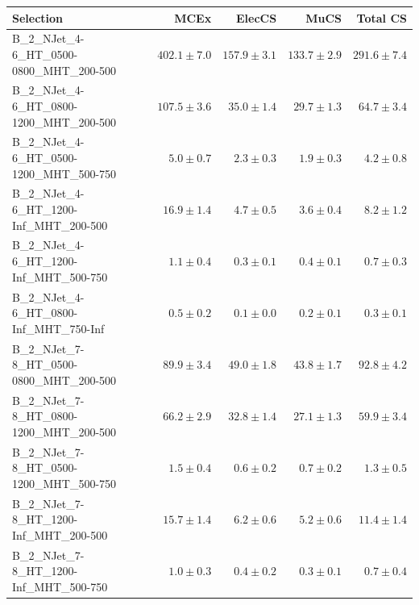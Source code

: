 \documentclass{beamer}
\begin{document}
\begin{frame}
\tiny
\begin{tabular}{lrrrr}
\toprule

                                                Selection  &          MCEx  &         ElecCS  &                     MuCS  &          Total CS  \\ 
\midrule
     B\_2\_NJet\_4-6\_HT\_0500-0800\_MHT\_200-500 &             $402.1\pm7.0$&            $157.9\pm3.1$&            $133.7\pm2.9$&                 $291.6\pm7.4$ \\ 
     B\_2\_NJet\_4-6\_HT\_0800-1200\_MHT\_200-500 &             $107.5\pm3.6$&             $35.0\pm1.4$&             $29.7\pm1.3$&                  $64.7\pm3.4$ \\ 
     B\_2\_NJet\_4-6\_HT\_0500-1200\_MHT\_500-750 &               $5.0\pm0.7$&              $2.3\pm0.3$&              $1.9\pm0.3$&                   $4.2\pm0.8$ \\ 
      B\_2\_NJet\_4-6\_HT\_1200-Inf\_MHT\_200-500 &              $16.9\pm1.4$&              $4.7\pm0.5$&              $3.6\pm0.4$&                   $8.2\pm1.2$ \\ 
      B\_2\_NJet\_4-6\_HT\_1200-Inf\_MHT\_500-750 &               $1.1\pm0.4$&              $0.3\pm0.1$&              $0.4\pm0.1$&                   $0.7\pm0.3$ \\ 
      B\_2\_NJet\_4-6\_HT\_0800-Inf\_MHT\_750-Inf &               $0.5\pm0.2$&              $0.1\pm0.0$&              $0.2\pm0.1$&                   $0.3\pm0.1$ \\ 
     B\_2\_NJet\_7-8\_HT\_0500-0800\_MHT\_200-500 &              $89.9\pm3.4$&             $49.0\pm1.8$&             $43.8\pm1.7$&                  $92.8\pm4.2$ \\ 
     B\_2\_NJet\_7-8\_HT\_0800-1200\_MHT\_200-500 &              $66.2\pm2.9$&             $32.8\pm1.4$&             $27.1\pm1.3$&                  $59.9\pm3.4$ \\ 
     B\_2\_NJet\_7-8\_HT\_0500-1200\_MHT\_500-750 &               $1.5\pm0.4$&              $0.6\pm0.2$&              $0.7\pm0.2$&                   $1.3\pm0.5$ \\ 
      B\_2\_NJet\_7-8\_HT\_1200-Inf\_MHT\_200-500 &              $15.7\pm1.4$&              $6.2\pm0.6$&              $5.2\pm0.6$&                  $11.4\pm1.4$ \\ 
      B\_2\_NJet\_7-8\_HT\_1200-Inf\_MHT\_500-750 &               $1.0\pm0.3$&              $0.4\pm0.2$&              $0.3\pm0.1$&                   $0.7\pm0.4$ \\ 

\end{tabular}
\end{frame}
\end{document}
